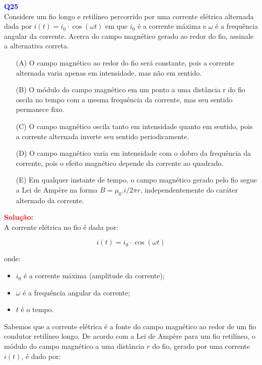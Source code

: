 \documentclass[a4paper,12pt]{article}
\begin{document}
\begin{flushleft}
\textbf{\textcolor{blue}{\Large Q25}}\\

Considere um fio longo e retilíneo percorrido por
uma corrente elétrica alternada dada por
$i(t) = i_0 \cdot \cos(\omega t)$ em que $i_0$ é a corrente máxima e $\omega$
é a frequência angular da corrente. Acerca do
campo magnético gerado ao redor do fio, assinale
a alternativa correta.

\begin{itemize}
\item[(A)] O campo magnético ao redor do fio será
constante, pois a corrente alternada varia apenas
em intensidade, mas não em sentido.
\item[(B)] O módulo do campo magnético em um ponto a
uma distância r do fio oscila no tempo com a
mesma frequência da corrente, mas seu sentido
permanece fixo.  
\item[(C)] O campo magnético oscila tanto em intensidade
quanto em sentido, pois a corrente alternada
inverte seu sentido periodicamente.
\item[(D)] O campo magnético varia em intensidade com o
dobro da frequência da corrente, pois o efeito
magnético depende da corrente ao quadrado.
\item[(E)] Em qualquer instante de tempo, o campo
magnético gerado pelo fio segue a Lei de
Ampère na forma $B = \mu_{0}.i/2\pi r$, independentemente
do caráter alternado da corrente.
\end{itemize}

\vspace{0.5cm}

\textcolor{red}{\textbf{Solução:}}\\

A corrente elétrica no fio é dada por:

\[
i(t) = i_0 \cdot \cos(\omega t)
\]

onde:

\begin{itemize}
    \item \(i_0\) é a corrente máxima (amplitude da corrente);
    \item \(\omega\) é a frequência angular da corrente;
    \item \(t\) é o tempo.
\end{itemize}

Sabemos que a corrente elétrica é a fonte do campo magnético ao redor de um fio condutor retilíneo longo. De acordo com a Lei de Ampère para um fio retilíneo, o módulo do campo magnético a uma distância \(r\) do fio, gerado por uma corrente \(i(t)\), é dado por:


\end{flushleft}
\end{document}
